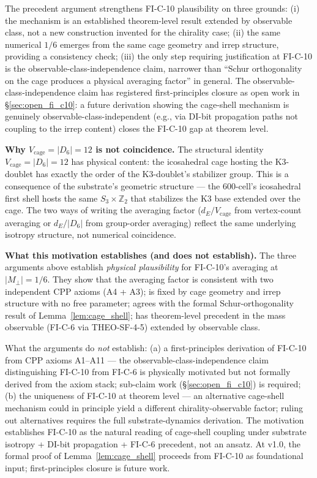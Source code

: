\documentclass[11pt,letterpaper]{article}
\newcommand{\Dsix}{D_6}
\newcommand{\Sthree}{S_3}
\begin{document}
The precedent argument strengthens FI-C-10 plausibility on three grounds: (i) the mechanism is an established theorem-level result extended by observable class, not a new construction invented for the chirality case; (ii) the same numerical $1/6$ emerges from the same cage geometry and irrep structure, providing a consistency check; (iii) the only step requiring justification at FI-C-10 is the observable-class-independence claim, narrower than ``Schur orthogonality on the cage produces a physical averaging factor'' in general. The observable-class-independence claim has registered first-principles closure as open work in \S\ref{sec:open_fi_c10}: a future derivation showing the cage-shell mechanism is genuinely observable-class-independent (e.g., via DI-bit propagation paths not coupling to the irrep content) closes the FI-C-10 gap at theorem level.

\textbf{Why $V_\text{cage} = |\Dsix| = 12$ is not coincidence.}
The structural identity $V_\text{cage} = |\Dsix| = 12$ has physical content: the icosahedral cage hosting the K3-doublet has exactly the order of the K3-doublet's stabilizer group. This is a consequence of the substrate's geometric structure --- the 600-cell's icosahedral first shell hosts the same $\Sthree \times \mathbb{Z}_2$ that stabilizes the K3 base extended over the cage. The two ways of writing the averaging factor ($d_E/V_\text{cage}$ from vertex-count averaging or $d_E/|\Dsix|$ from group-order averaging) reflect the same underlying isotropy structure, not numerical coincidence.

\textbf{What this motivation establishes (and does not establish).}
The three arguments above establish \emph{physical plausibility} for FI-C-10's averaging at $|M_\perp| = 1/6$. They show that the averaging factor is consistent with two independent CPP axioms (A4 + A3); is fixed by cage geometry and irrep structure with no free parameter; agrees with the formal Schur-orthogonality result of Lemma~\ref{lem:cage_shell}; has theorem-level precedent in the mass observable (FI-C-6 via THEO-SF-4-5) extended by observable class.

What the arguments do \emph{not} establish: (a) a first-principles derivation of FI-C-10 from CPP axioms A1--A11 --- the observable-class-independence claim distinguishing FI-C-10 from FI-C-6 is physically motivated but not formally derived from the axiom stack; sub-claim work (\S\ref{sec:open_fi_c10}) is required; (b) the uniqueness of FI-C-10 at theorem level --- an alternative cage-shell mechanism could in principle yield a different chirality-observable factor; ruling out alternatives requires the full substrate-dynamics derivation. The motivation establishes FI-C-10 as the natural reading of cage-shell coupling under substrate isotropy + DI-bit propagation + FI-C-6 precedent, not an ansatz. At v1.0, the formal proof of Lemma~\ref{lem:cage_shell} proceeds from FI-C-10 as foundational input; first-principles closure is future work.
\end{document}
